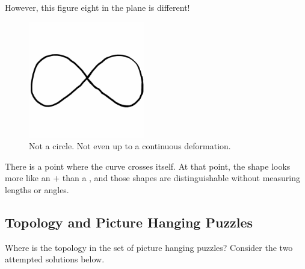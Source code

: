 \documentclass[12pt,letterpaper]{article}
\theoremstyle{definition}
\begin{document}
However, this figure eight in the plane is different!
\begin{figure}[h]
\centering
\includegraphics[height=2in]{phppics/fig8.png}
\caption{Not a circle. Not even up to a continuous deformation.}
\end{figure}

There is a point where the curve crosses itself.
At that point, the shape looks more like an $+$ than a \textbar, and those shapes are distinguishable without measuring lengths or angles.


\subsection*{Topology and Picture Hanging Puzzles}

Where is the topology in the set of picture hanging puzzles?
Consider the two attempted solutions below.
\end{document}
